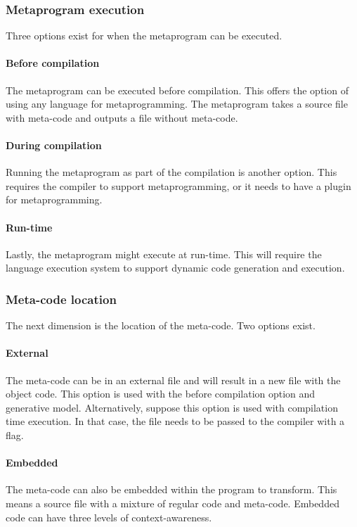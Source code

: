 \subsubsection{Metaprogram execution}
Three options exist for when the metaprogram can be executed.

\paragraph{Before compilation}
The metaprogram can be executed before compilation.
This offers the option of using any language for metaprogramming.
The metaprogram takes a source file with meta-code and outputs a file without meta-code.

\paragraph{During compilation}
Running the metaprogram as part of the compilation is another option.
This requires the compiler to support metaprogramming, or it needs to have a plugin for metaprogramming.

\paragraph{Run-time}
Lastly, the metaprogram might execute at run-time.
This will require the language execution system to support dynamic code generation and execution.

\subsubsection{Meta-code location}
The next dimension is the location of the meta-code.
Two options exist.

\paragraph{External}
The meta-code can be in an external file and will result in a new file with the object code.
This option is used with the before compilation option and generative model.
Alternatively, suppose this option is used with compilation time execution.
In that case, the file needs to be passed to the compiler with a flag.

\paragraph{Embedded}
The meta-code can also be embedded within the program to transform.
This means a source file with a mixture of regular code and meta-code.
Embedded code can have three levels of context-awareness.

